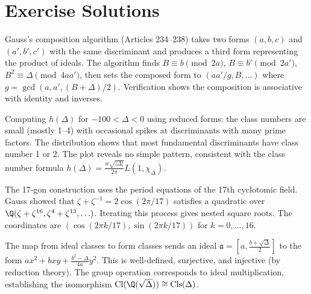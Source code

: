 \section{Exercise Solutions}

\begin{solution}
Gauss's composition algorithm (Articles 234--238) takes two forms $(a,b,c)$ and $(a',b',c')$ with the same discriminant and produces a third form representing the product of ideals. The algorithm finds $B \equiv b \pmod{2a}$, $B \equiv b' \pmod{2a'}$, $B^2 \equiv \Delta \pmod{4aa'}$, then sets the composed form to $(aa'/g, B, \ldots)$ where $g = \gcd(a, a', (B+\Delta)/2)$. Verification shows the composition is associative with identity and inverses.
\end{solution}

\begin{solution}
Computing $h(\Delta)$ for $-100 < \Delta < 0$ using reduced forms: the class numbers are small (mostly 1--4) with occasional spikes at discriminants with many prime factors. The distribution shows that most fundamental discriminants have class number 1 or 2. The plot reveals no simple pattern, consistent with the class number formula $h(\Delta) = \frac{w\sqrt{|\Delta|}}{2\pi} L(1, \chi_\Delta)$.
\end{solution}

\begin{solution}
The 17-gon construction uses the period equations of the 17th cyclotomic field. Gauss showed that $\zeta + \zeta^{-1} = 2\cos(2\pi/17)$ satisfies a quadratic over $\Q(\zeta+\zeta^{16}, \zeta^4+\zeta^{13}, \ldots)$. Iterating this process gives nested square roots. The coordinates are $(\cos(2\pi k/17), \sin(2\pi k/17))$ for $k = 0, \ldots, 16$.
\end{solution}

\begin{solution}
The map from ideal classes to form classes sends an ideal $\mathfrak{a} = [a, \frac{b+\sqrt{\Delta}}{2}]$ to the form $a x^2 + bxy + \frac{b^2-\Delta}{4a} y^2$. This is well-defined, surjective, and injective (by reduction theory). The group operation corresponds to ideal multiplication, establishing the isomorphism $\operatorname{Cl}(\Q(\sqrt{\Delta})) \cong \operatorname{Cls}(\Delta)$.
\end{solution}
